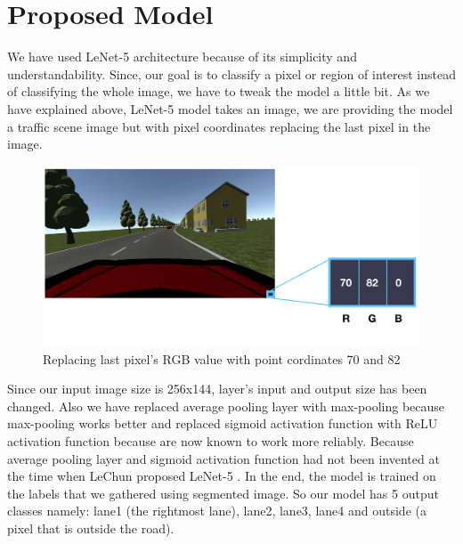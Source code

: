 \section{Proposed Model}
\par
We have used LeNet-5 architecture because of its simplicity and understandability. Since, our goal is to classify a pixel or region of interest instead of classifying the whole image, we have to tweak the model a little bit. As we have explained above, LeNet-5 model takes an image, we are providing the model a traffic scene image but with pixel coordinates replacing the last pixel in the image.
\begin{figure}[H]
  \centering
  \includegraphics[scale=0.40]{images/Chapter4/last_point.png}
  \caption{Replacing last pixel's RGB value with point cordinates 70 and 82}
  \label{fig:last_point}
\end{figure}
Since our input image size is 256x144, layer's input and output size has been changed. Also we have replaced average pooling layer with max-pooling because max-pooling works better and replaced sigmoid activation function with ReLU activation function because are now known to work more reliably. Because average pooling layer and sigmoid activation function had not been invented at the time when LeChun proposed LeNet-5 \cite{lecun1998gradient}. In the end, the model is trained on the labels that we gathered using segmented image. So our model has 5 output classes namely: lane1 (the rightmost lane), lane2, lane3, lane4 and outside (a pixel that is outside the road).
